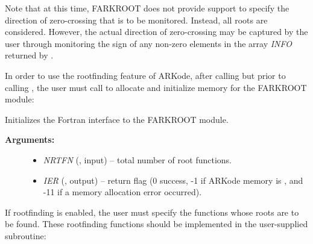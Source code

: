 \documentclass[letterpaper,10pt,english]{sphinxmanual}
\begin{document}
Note that at this time, FARKROOT does not provide support to specify
the direction of zero-crossing that is to be monitored.  Instead, all
roots are considered.  However, the actual direction of zero-crossing
may be captured by the user through monitoring the sign of any
non-zero elements in the array \emph{INFO} returned by
{\hyperref[f_interface/Rootfinding:f/_/FARKROOTINFO]{}}.

In order to use the rootfinding feature of ARKode, after calling {\hyperref[f_interface/Usage:f/_/FARKMALLOC]{}} but prior to
calling {\hyperref[f_interface/Usage:f/_/FARKODE]{}}, the user must call
{\hyperref[f_interface/Rootfinding:f/_/FARKROOTINIT]{}} to allocate and initialize memory for the FARKROOT module:

\begin{fulllineitems}
\label{f_interface/Rootfinding:f/_/FARKROOTINIT}
Initializes the Fortran interface to the FARKROOT module.
\begin{description}
\item[{\textbf{Arguments:}}] \leavevmode\begin{itemize}
\item {} 
\emph{NRTFN} (, input) -- total number of root functions.

\item {} 
\emph{IER} (, output) -- return flag (0 success, -1 if
ARKode memory is , and -11 if a memory allocation
error occurred).

\end{itemize}

\end{description}

\end{fulllineitems}


If rootfinding is enabled, the user must specify the functions whose
roots are to be found.  These rootfinding functions should be
implemented in the user-supplied {\hyperref[f_interface/Rootfinding:f/_/FARKROOTFN]{}} subroutine:
\end{document}
